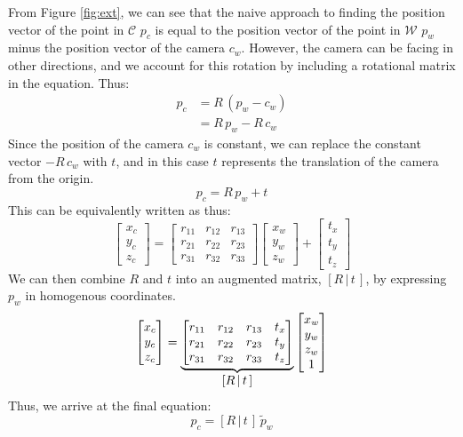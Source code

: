 From Figure \ref{fig:ext}, we can see that the naive approach to finding the position vector of the point in $\mathcal{C}$ $p_c$ is equal to the position vector of the point in $\mathcal{W}$ $p_w$ minus the position vector of the camera $c_w$. However, the camera can be facing in other directions, and we account for this rotation by including a rotational matrix in the equation. Thus: 
\begin{align}
    p_c & = R\,(p_w-c_w) \nonumber        \\
        & = R\,p_w -R\,c_w 
\end{align}
Since the position of the camera $c_w$ is constant, we can replace the constant vector $-R\,c_w$ with $t$, and in this case $t$ represents the translation of the camera from the origin. 
\begin{equation}
    p_c = R\,p_w + t
\end{equation}
This can be equivalently written as thus:
\begin{equation*}
    \begin{bmatrix}
        x_c \\ y_c \\ z_c
    \end{bmatrix}
    =
    \begin{bmatrix}
        r_{11} & r_{12} & r_{13} \\
        r_{21} & r_{22} & r_{23} \\
        r_{31} & r_{32} & r_{33}
    \end{bmatrix}
    \begin{bmatrix}
        x_w \\ y_w \\ z_w
    \end{bmatrix}
    +
    \begin{bmatrix}
        t_x \\ t_y \\ t_z
    \end{bmatrix}
\end{equation*}
We can then combine $R$ and $t$ into an augmented matrix, $[R\,|\,t\,]$, by expressing $p_w$ in homogenous coordinates.
\begin{equation}
    \begin{bmatrix}
        x_c \\ y_c \\ z_c
    \end{bmatrix}
    =
    \underbrace{
        \begin{bmatrix}
        r_{11} & r_{12} & r_{13} & t_x \\
        r_{21} & r_{22} & r_{23} & t_y \\
        r_{31} & r_{32} & r_{33} & t_z \\
    \end{bmatrix}
    }_{\mathlarger{[R\,|\,t\,]}}
    \begin{bmatrix}
        x_w \\ y_w \\ z_w \\ 1
    \end{bmatrix}
\end{equation}
Thus, we arrive at the final equation:
\begin{equation}
    p_c=[R\,|\,t\,]\,\widetilde{p}_w \label{eq:pc}
\end{equation}

